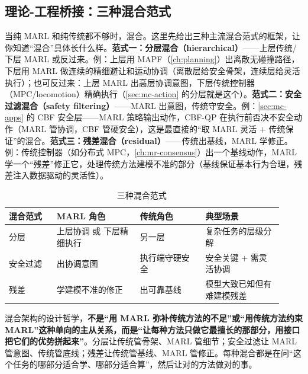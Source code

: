 \subsection{理论-工程桥接：三种混合范式}
\label{sec:mc-hybrid}

当纯 MARL 和纯传统都不够时，混合。这里先给出三种主流混合范式的框架，让你知道“混合”具体长什么样。\textbf{范式一：分层混合（hierarchical）}——上层传统/下层 MARL 或反过来。例：上层用 MAPF（\cref{ch:planning}）出离散无碰撞路径，下层用 MARL 做连续的精细避让和运动协调（离散层给安全骨架，连续层给灵活执行）；也可反过来：上层 MARL 出高层协调意图，下层传统控制器（MPC/locomotion）精确执行（\cref{sec:mc-action} 的分层就是这个）。\textbf{范式二：安全过滤混合（safety filtering）}——MARL 出意图，传统守安全。例：\cref{sec:mc-apps} 的 CBF 安全层——MARL 策略输出动作，CBF-QP 在执行前否决不安全动作（MARL 管协调，CBF 管硬安全），这是最直接的“取 MARL 灵活 $+$ 传统保证”的混合。\textbf{范式三：残差混合（residual）}——传统出基线，MARL 学修正。例：传统控制器（如分布式 MPC，\cref{ch:mr-consensus}）出一个基线动作，MARL 学一个“残差”修正它，处理传统方法建模不准的部分（基线保证基本行为合理，残差注入数据驱动的灵活性）。

\begin{table}[H]\centering\small
\caption{三种混合范式}
\label{tab:mc-hybrid}
\begin{tabular}{p{0.16\linewidth}p{0.28\linewidth}p{0.22\linewidth}p{0.26\linewidth}}
\toprule
混合范式 & MARL 角色 & 传统角色 & 典型场景 \\
\midrule
分层 & 上层协调 或 下层精细执行 & 另一层 & 复杂任务的层级分解 \\
安全过滤 & 出协调意图 & 执行端守硬安全 & 安全关键 $+$ 需灵活协调 \\
残差 & 学建模不准的修正 & 出可靠基线 & 模型大致已知但有难建模残差 \\
\bottomrule
\end{tabular}
\end{table}

\begin{insight}
混合架构的设计哲学，\textbf{不是“用 MARL 弥补传统方法的不足”或“用传统方法约束 MARL”这种单向的主从关系，而是“让每种方法只做它最擅长的那部分，用接口把它们的优势拼起来”}。分层让传统管骨架、MARL 管细节；安全过滤让 MARL 管意图、传统管底线；残差让传统管基线、MARL 管修正。每种混合都是在问“这个任务的哪部分适合学、哪部分适合算”，然后让对的方法做对的事。
\end{insight}

